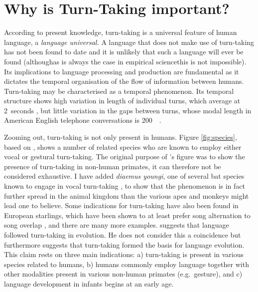 \section{Why is Turn-Taking important?}
\label{sec:intrott}
According to present knowledge, turn-taking is a universal feature of human language, a \emph{language universal.}
A language that does not make use of turn-taking has not been found to date and it is unlikely that such a language will ever be found (although\dash as is always the case in empirical science\dash this is not impossible).
Its implications to language processing and production are fundamental as it dictates the temporal organisation of the flow of information between humans.
Turn-taking may be characterised as a temporal phenomenon.
Its temporal structure shows high variation in length of individual turns, which average at 2~seconds \citep[]{levinson_turn-taking_2016}, but little variation in the gaps between turns, whose modal length in American English telephone conversations is 200~\ms\ \citep[]{levinson_timing_2015}.

Zooming out, turn-taking is not only present in humans.
Figure \ref{fig:species}, based on \citet[]{levinson_turn-taking_2016}, shows a number of related species who are known to employ either vocal or gestural turn-taking.
The original purpose of \citeauthor{levinson_turn-taking_2016}'s figure was to show the presence of turn-taking in non-human primates, it can therefore not be considered exhaustive.
I have added \emph{diaemus youngi}, one of several bat species known to engage in vocal turn-taking \citep[]{vernes_what_2017}, to show that the phenomenon is in fact further spread in the animal kingdom than the various apes and monkeys might lead one to believe.
Some indications for turn-taking have also been found in European starlings, which have been shown to at least prefer song alternation to song overlap \citep{henry_social_2015}, and there are many more examples.
\citet[]{levinson_turn-taking_2016} suggests that language followed turn-taking in evolution. He does not consider this a coincidence but furthermore suggests that turn-taking formed the basis for language evolution.
This claim rests on three main indications: a) turn-taking is present in various species related to humans, b) humans commonly employ language together with other modalities present in various non-human primates (e.g.~gesture), and c) language development in infants begins at an early age.

